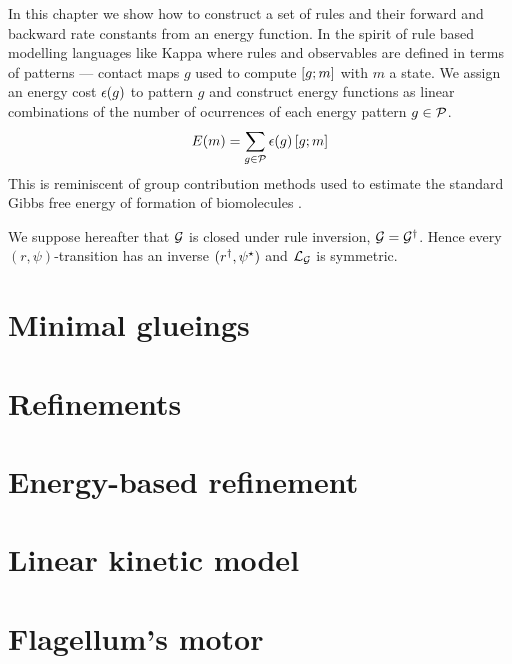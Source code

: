 In this chapter we show how to construct
a set of rules and their forward and backward rate constants
from an energy function.
In the spirit of rule based modelling languages like Kappa
where rules and observables are defined in terms of patterns ---
contact maps $g$ used to compute $\left[g;m\right]$ with $m$ a state.
We assign an energy cost $\epsilon(g)$ to pattern $g$
and construct energy functions as linear combinations
of the number of ocurrences of each energy pattern $g \in \mathcal{P}$.
\[ E(m) = \sum_{g \in \mathcal{P}} \epsilon(g) \left[g;m\right] \]
This is reminiscent of group contribution methods
used to estimate the standard Gibbs free energy of formation
of biomolecules \citep{group-contrib}.







We suppose hereafter that $\mathcal{G}$ is closed under
rule inversion, \ie $\mathcal{G} = \mathcal{G}^\dagger$.
Hence every $(r,\psi)$-transition
has an inverse $(r^\dagger,\psi^\star)$
and $\mathcal{L}_{\mathcal{G}}$ is symmetric.


\section{Minimal glueings}
\label{sec:mg}


\section{Refinements} %
\label{sec:gp}
\fi


\section{Energy-based refinement}
\label{sec:energy-gp}


\section{Linear kinetic model}
\label{sec:kinetic-model}

%
%


\section{Flagellum's motor}
\label{sec:alloring}




